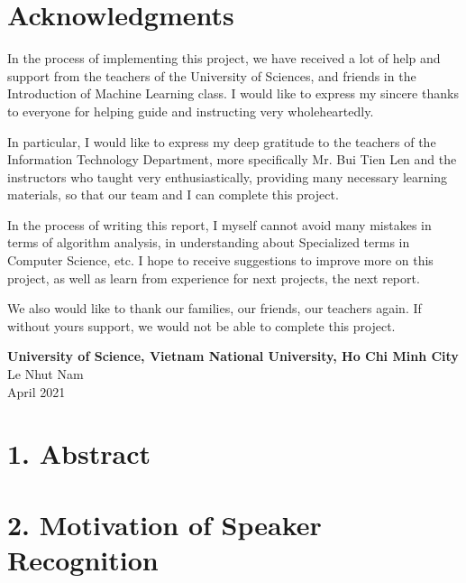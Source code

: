 \documentclass{article}
\begin{document}
	\cleardoublepage
	\section*{Acknowledgments}
	\vspace{1.0in}
	\begingroup
	\setlength{\parindent}{0pt}
	\qquad In the process of implementing this project, we have received a lot of help and support from the teachers of the University of Sciences, and friends in the Introduction of Machine Learning class. I would like to express my sincere thanks to everyone for helping guide and instructing very wholeheartedly.
	
	In particular, I would like to express my deep gratitude to the teachers of the Information Technology Department, more specifically Mr. Bui Tien Len and the instructors who taught very enthusiastically, providing many necessary learning materials, so that  our team and I can complete this project.
	
	In the process of writing this report, I myself cannot avoid many mistakes in terms of algorithm analysis, in understanding about Specialized terms in Computer Science, etc. I hope to receive suggestions to improve more on this project, as well as learn from experience for next projects, the next report.
	
	We also would like to thank our families, our friends, our teachers again. If without yours support, we would not be able to complete this project. 
	
	\vspace{1.0in}
	\textbf{University of Science, Vietnam National University, Ho Chi Minh City}\\
	Le Nhut Nam\\
	April 2021\\
	\endgroup
	
	\newpage
	\tableofcontents
	\newpage
	\setcounter{secnumdepth}{0}
	
	\section{1. Abstract}
	
	
	\section{2. Motivation of Speaker Recognition}
	
\end{document}

